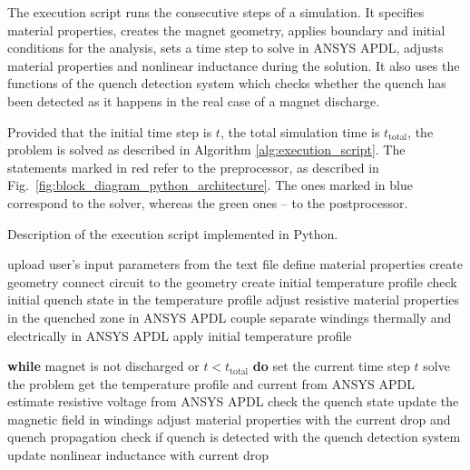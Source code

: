 
The execution script runs the consecutive steps of a simulation. It specifies material properties, creates the magnet geometry, applies boundary and initial conditions for the analysis, sets a time step to solve in ANSYS APDL, adjusts material properties and nonlinear inductance during the solution. It also uses the functions of the quench detection system which checks whether the quench has been detected as it happens in the real case of a magnet discharge.

Provided that the initial time step is $t$, the total simulation time is $t_\text{total}$, the problem is solved as described in Algorithm \ref{alg:execution_script}. The statements marked in red refer to the preprocessor, as described in Fig.~\ref{fig:block_diagram_python_architecture}. The ones marked in blue correspond to the solver, whereas the green ones -- to the postprocessor.

\begin{algorithm}[H]
  \caption{Description of the execution script implemented in Python.}
  \label{alg:execution_script}
  \begin{algorithmic}[1]
    \STATE upload user's input parameters from the text file
    \color{red} \STATE  define material properties
    \STATE create geometry 
    \STATE connect circuit to the geometry
    \STATE create initial temperature profile
    \STATE check initial quench state in the temperature profile
    \STATE adjust resistive material properties in the quenched zone in ANSYS APDL
    \STATE couple separate windings thermally and electrically in ANSYS APDL
    \color{blue} \STATE apply initial temperature profile
    
    \color{black} \STATE \textbf{while} magnet is not discharged or $t < t_\text{total}$ \textbf{do}
        \color{blue} \STATE \hspace{0.5cm} set the current time step $t$
        \STATE \hspace{0.5cm} solve the problem
        \color{ForestGreen} \STATE \hspace{0.5cm} get the temperature profile and current from ANSYS APDL
        \STATE \hspace{0.5cm} estimate resistive voltage from ANSYS APDL
        \STATE \hspace{0.5cm} check the quench state
        \STATE \hspace{0.5cm} update the magnetic field in windings
        \color{red} \STATE \hspace{0.5cm} adjust material properties with the current drop and quench propagation
        \STATE \hspace{0.5cm} check if quench is detected with the quench detection system
        \STATE \hspace{0.5cm} update nonlinear inductance with current drop

  \end{algorithmic}
\end{algorithm}